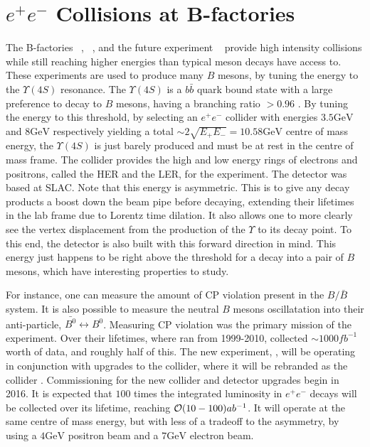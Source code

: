 \section{$e^+ e^-$ Collisions at B-factories}
\label{sec:ee_experiment}
The B-factories \babar~\cite{Boutigny:1995ib}, \belle~\cite{Cheng:1995im}, and the future experiment \belletwo~\cite{Abe:2010gxa} provide high intensity collisions while still reaching higher energies than typical meson decays have access to.
These experiments are used to produce many $B$ mesons, by tuning the energy to the $\Upsilon(4S)$ resonance.
The $\Upsilon(4S)$ is a $b\bar{b}$ quark bound state with a large preference to decay to $B$ mesons, having a branching ratio $> 0.96$ \cite{Agashe:2014kda}.
By tuning the energy to this threshold, by selecting an $e^+ e^-$ collider with energies $3.5\textrm{GeV}$ and $8\textrm{GeV}$ respectively yielding a total $\sim 2\sqrt{E_+ E_-} = 10.58\textrm{GeV}$ centre of mass energy, the $\Upsilon(4S)$ is just barely produced and must be at rest in the centre of mass frame.
The \kekb collider provides the high and low energy rings of electrons and positrons, called the HER and the LER, for the \belle experiment.
The \babar detector was based at SLAC.
Note that this energy is asymmetric.
This is to give any decay products a boost down the beam pipe before decaying, extending their lifetimes in the lab frame due to Lorentz time dilation.
It also allows one to more clearly see the vertex displacement from the production of the $\Upsilon$ to its decay point.
To this end, the detector is also built with this forward direction in mind.
This energy just happens to be right above the threshold for a decay into a pair of $B$ mesons, which have interesting properties to study.

For instance, one can measure the amount of CP violation present in the $B/\bar{B}$ system.
It is also possible to measure the neutral $B$ mesons oscillatation into their anti-particle, $\bar{B^0} \leftrightarrow B^0$.
Measuring CP violation was the primary mission of the \babar experiment.
Over their lifetimes, where \belle ran from 1999-2010, \belle collected $\sim 1000fb^{-1}$ worth of data, and \babar roughly half of this.
The new experiment, \belletwo, will be operating in conjunction with upgrades to the \kekb collider, where it will be rebranded as the \superkekb collider \cite{Akeroyd:2004mj}.
Commissioning for the new collider and detector upgrades begin in 2016.
It is expected that $100$ times the integrated luminosity in $e^+ e^-$ decays will be collected over its lifetime, reaching $\operatorname{\mathcal{O}}(10-100)ab^{-1}$.
It will operate at the same centre of mass energy, but with less of a tradeoff to the asymmetry, by using a $4\textrm{GeV}$ positron beam and a $7\textrm{GeV}$ electron beam.

